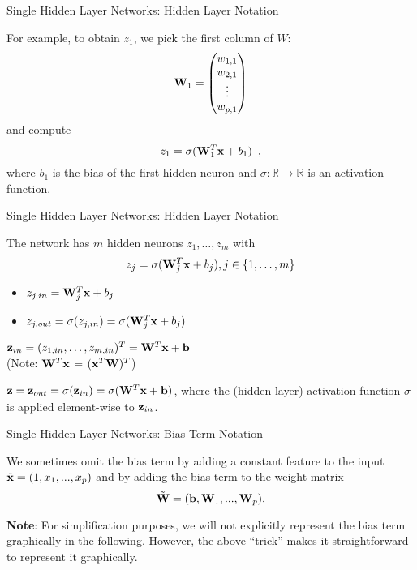 \documentclass[11pt,compress,t,notes=noshow, xcolor=table]{beamer}
\begin{document}
\begin{framei}{Single Hidden Layer Networks: Hidden Layer Notation}

\item For example, to obtain $z_1$, we pick the first column of $W$:
    $$\mathbf{W}_1 =
     \begin{pmatrix}
      w_{1,1} \\
      w_{2,1} \\
      \vdots  \\
      w_{p,1}
     \end{pmatrix}$$
and compute 
$$z_1 = \sigma(\mathbf{W}_1^T \mathbf{x} + b_1)\enspace,$$
 where $b_1$ is the bias of the first hidden neuron and $\sigma: \mathbb{R} \to \mathbb{R}$ is an activation function. 
    
\end{framei}
\begin{framei}{Single Hidden Layer Networks: Hidden Layer Notation}

\item The network has $m$ hidden neurons $z_1, \dots, z_m$ with
    $$ z_j = \sigma(\mathbf{W}_j^T \mathbf{x} + b_j), j \in \{1,\ldots,m\}$$
    \begin{itemize}
    \item $z_{j,in}  = \mathbf{W}_j^T \mathbf{x} + b_j$
    \item $z_{j,out} = \sigma(z_{j,in}) = \sigma(\mathbf{W}_j^T \mathbf{x} + b_j)$
    \end{itemize}
\item $ \mathbf{z}_{in} = (z_{1,in}, \dots, z_{m,in})^T = \mathbf{W}^T \mathbf{x} + \mathbf{b}$ \\ (Note: $\mathbf{W}^T \mathbf{x}$ = $(\mathbf{x}^T \mathbf{W})^T$)
\item $ \mathbf{z} = \mathbf{z}_{out} = \sigma(\mathbf{z}_{in}) = \sigma(\mathbf{W}^T \mathbf{x} + \mathbf{b})$, where the (hidden layer) activation function $\sigma$ is applied element-wise to $\mathbf{z}_{in}$.  

\end{framei}


\begin{framei}[sep=L]{Single Hidden Layer Networks: Bias Term Notation}

\item We sometimes omit the bias term by adding a constant feature to the input $\tilde{\mathbf{x}} = (1, x_1, ..., x_p)$ and by adding the bias term to the weight matrix 
$$\tilde{\mathbf{W}} = (\mathbf{b}, \mathbf{W}_1, ..., \mathbf{W}_p).$$ 
\item \textbf{Note}: For simplification purposes, we will not explicitly represent the bias term graphically in the following. However, the above \enquote{trick} makes it straightforward to represent it graphically. 

\end{framei}
\end{document}
